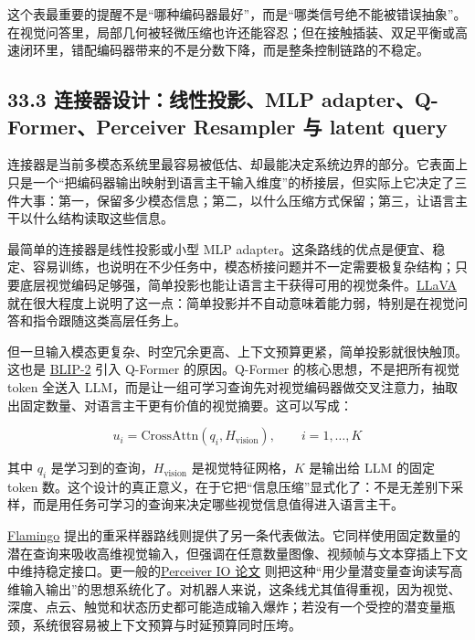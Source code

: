 这个表最重要的提醒不是“哪种编码器最好”，而是“哪类信号绝不能被错误抽象”。在视觉问答里，局部几何被轻微压缩也许还能容忍；但在接触插装、双足平衡或高速闭环里，错配编码器带来的不是分数下降，而是整条控制链路的不稳定。

\subsection*{33.3 连接器设计：线性投影、MLP adapter、Q-Former、Perceiver Resampler 与 latent query}


连接器是当前多模态系统里最容易被低估、却最能决定系统边界的部分。它表面上只是一个“把编码器输出映射到语言主干输入维度”的桥接层，但实际上它决定了三件大事：第一，保留多少模态信息；第二，以什么压缩方式保留；第三，让语言主干以什么结构读取这些信息。

最简单的连接器是线性投影或小型 MLP adapter。这条路线的优点是便宜、稳定、容易训练，也说明在不少任务中，模态桥接问题并不一定需要极复杂结构；只要底层视觉编码足够强，简单投影也能让语言主干获得可用的视觉条件。\href{https://arxiv.org/abs/2304.08485}{LLaVA} 就在很大程度上说明了这一点：简单投影并不自动意味着能力弱，特别是在视觉问答和指令跟随这类高层任务上。

但一旦输入模态更复杂、时空冗余更高、上下文预算更紧，简单投影就很快触顶。这也是 \href{https://arxiv.org/abs/2301.12597}{BLIP-2} 引入 Q-Former 的原因。Q-Former 的核心思想，不是把所有视觉 token 全送入 LLM，而是让一组可学习查询先对视觉编码器做交叉注意力，抽取出固定数量、对语言主干更有价值的视觉摘要。这可以写成：

\begingroup
\footnotesize
\begin{equation*}
u_i = \mathrm{CrossAttn}(q_i, H_{\text{vision}}), \qquad i=1,\dots,K
\end{equation*}
\endgroup

其中 \(q_i\) 是学习到的查询，\(H_{\text{vision}}\) 是视觉特征网格，\(K\) 是输出给 LLM 的固定 token 数。这个设计的真正意义，在于它把“信息压缩”显式化了：不是无差别下采样，而是用任务可学习的查询来决定哪些视觉信息值得进入语言主干。

\href{https://arxiv.org/abs/2204.14198}{Flamingo} 提出的重采样器路线则提供了另一条代表做法。它同样使用固定数量的潜在查询来吸收高维视觉输入，但强调在任意数量图像、视频帧与文本穿插上下文中维持稳定接口。更一般的\href{https://arxiv.org/abs/2107.14795}{Perceiver IO 论文} 则把这种“用少量潜变量查询读写高维输入输出”的思想系统化了。对机器人来说，这条线尤其值得重视，因为视觉、深度、点云、触觉和状态历史都可能造成输入爆炸；若没有一个受控的潜变量瓶颈，系统很容易被上下文预算与时延预算同时压垮。

